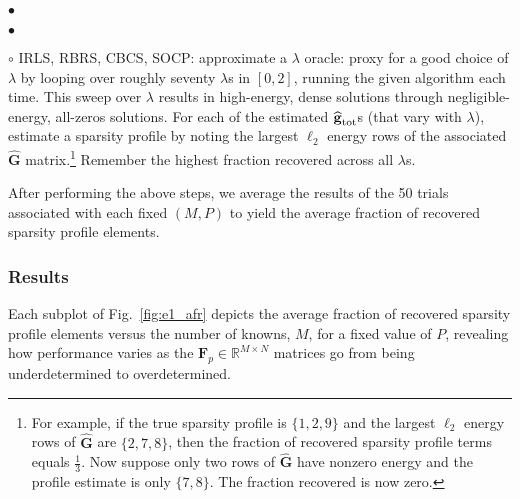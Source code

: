 \documentclass[final]{siamltex}
\newenvironment{adamItemize2}{\begin{list}{$\bullet$}
{\setlength{\rightmargin}{0em}
\setlength{\leftmargin}{1.0em}
\setlength{\itemsep}{4pt}
\setlength{\topsep}{2pt}
\setlength{\parsep}{0pt}}}{\end{list}}
\newcommand{\field}[1]{\mathbb{#1}}
\newcommand{\la}[1]{\mbox{$\mathbf{#1}$}}  \newcommand{\sst}[1]{\mbox{\scriptsize{#1}}}
\begin{document}
\begin{adamItemize2}
\begin{adamItemize2}
       \item[$\circ$] IRLS, RBRS, CBCS, SOCP: approximate a $\lambda$
       oracle: proxy for a good choice of $\lambda$ by looping over
       roughly seventy $\lambda$s in $[0, 2]$, running the given
       algorithm each time.  This sweep over $\lambda$ results in
       high-energy, dense solutions through negligible-energy,
       all-zeros solutions.  For each of the estimated
       $\widehat{\la{g}}_{\sst{tot}}$s (that vary with $\lambda$),
       estimate a sparsity profile by noting the largest $\ell_2$
       energy rows of the associated $\widehat{\la{G}}$
       matrix.\footnote{For example, if the true sparsity profile is
       $\{1, 2, 9\}$ and the largest $\ell_2$ energy rows of
       $\widehat{\la{G}}$ are $\{2, 7, 8\}$, then the fraction of
       recovered sparsity profile terms equals $\frac{1}{3}$.  Now
       suppose only two rows of $\widehat{\la{G}}$ have nonzero energy
       and the profile estimate is only $\{7, 8\}$.  The fraction
       recovered is now zero.} Remember the highest fraction
       recovered across all $\lambda$s.

       \end{adamItemize2}

   \end{adamItemize2}
   After performing the above steps, we average the results of the 50
   trials associated with each fixed $(M, P)$ to yield the average
   fraction of recovered sparsity profile elements.

   \subsubsection{Results} Each subplot of Fig.~\ref{fig:e1_afr}
   depicts the average fraction of recovered sparsity profile elements
   versus the number of knowns, $M$, for a fixed value of $P$,
   revealing how performance varies as the $\la{F}_p \in \field{R}^{M
   \times N}$ matrices go from being underdetermined to
   overdetermined.
\end{document}
